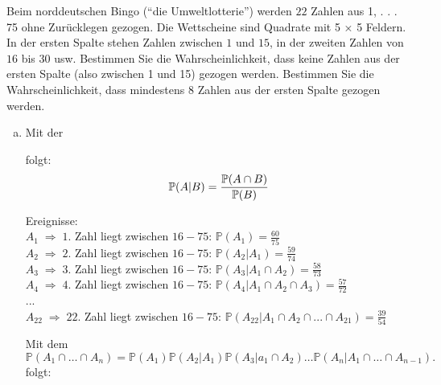 \begin{uebsp}
\begin{Exercise}[label=ex:1.3]
Beim norddeutschen Bingo (“die Umweltlotterie”) werden $22$ Zahlen aus
{1, . . . 75} ohne Zurücklegen gezogen. Die Wettscheine sind Quadrate mit 5 × 5 Feldern. In der ersten Spalte stehen Zahlen zwischen $1$ und $15$, in der zweiten Zahlen von $16$ bis $30$ usw.
\Question
Bestimmen Sie die Wahrscheinlichkeit, dass keine Zahlen aus der ersten Spalte (also zwischen 1 und 15) gezogen werden.
\Question
Bestimmen Sie die Wahrscheinlichkeit, dass mindestens 8 Zahlen aus
der ersten Spalte gezogen werden.
\end{Exercise}
\begin{Answer}
\begin{enumerate}[(a)]
    \item Mit der 
        \begin{uebsp_theory}
         folgt:
        \[\mathbb P(A|B)={\mathbb P(A\cap B)\over \mathbb P(B)}\]
        \end{uebsp_theory}

        Ereignisse: \\
        $A_1\;\Rightarrow\;1.$ Zahl liegt zwischen $16-75$: $\mathbb{P}(A_1)=\frac{60}{75}$\\
        $A_2\;\Rightarrow\;2.$ Zahl liegt zwischen $16-75$: $\mathbb{P}(A_2|A_1)=\frac{59}{74}$\\
        $A_3\;\Rightarrow\;3.$ Zahl liegt zwischen $16-75$: $\mathbb{P}(A_3|A_1\cap A_2)=\frac{58}{73}$\\
        $A_4\;\Rightarrow\;4.$ Zahl liegt zwischen $16-75$: $\mathbb{P}(A_4|A_1\cap A_2\cap A_3)=\frac{57}{72}$\\
        ...\\
        $A_{22}\;\Rightarrow\;22.$ Zahl liegt zwischen $16-75$: $\mathbb{P}(A_{22}|A_1\cap A_2\cap ...\cap A_{21})=\frac{39}{54}$\\

        \begin{uebsp_theory}
        Mit dem  
        \[\mathbb P(A_1\cap\dots\cap A_n)=\mathbb P(A_1)\mathbb P(A_2|A_1)\mathbb P
        (A_3|a_1\cap A_2)\dots\mathbb P(A_n|A_1\cap\dots\cap A_{n-1}).\]
        folgt:
        \end{uebsp_theory}


\end{enumerate}
\end{Answer}
\end{uebsp}
